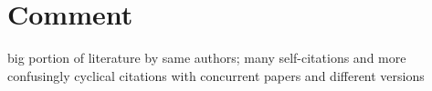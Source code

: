 \documentclass[12pt]{article}
\title{\todo} %
\author{Kenny Chiu} %
\date{\today} %
\begin{document}
\maketitle








\newpage


\section{Comment}

\todo big portion of literature by same authors; many self-citations and more confusingly cyclical citations with concurrent papers and different versions


\newpage




\end{document}
